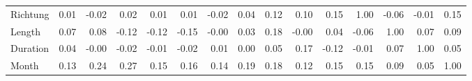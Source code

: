 \begin{tabular}{lrrrrrrrrrrrrrr}
Richtung      &       0.01 &      -0.02 &      0.02 &      0.01 &      0.01 &        -0.02 &         0.04 &     0.12 &           0.10 &    0.15 &      1.00 &   -0.06 &     -0.01 &   0.15 \\
Length        &       0.07 &       0.08 &     -0.12 &     -0.12 &     -0.15 &        -0.00 &         0.03 &     0.18 &          -0.00 &    0.04 &     -0.06 &    1.00 &      0.07 &   0.09 \\
Duration      &       0.04 &      -0.00 &     -0.02 &     -0.01 &     -0.02 &         0.01 &         0.00 &     0.05 &           0.17 &   -0.12 &     -0.01 &    0.07 &      1.00 &   0.05 \\
Month         &       0.13 &       0.24 &      0.27 &      0.15 &      0.16 &         0.14 &         0.19 &     0.18 &           0.12 &    0.15 &      0.15 &    0.09 &      0.05 &   1.00 \\
\bottomrule
\end{tabular}
